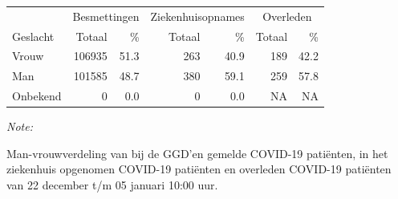 \documentclass[
  english,
  man,floatsintext]{apa6}
\begin{document}
\begin{table}
\centering\begingroup\fontsize{11}{13}\selectfont

\begin{threeparttable}
\begin{tabular}{lrrrrrr}
\toprule
\multicolumn{1}{c}{ } & \multicolumn{2}{c}{Besmettingen} & \multicolumn{2}{c}{Ziekenhuisopnames} & \multicolumn{2}{c}{Overleden} \\
\cmidrule(l{3pt}r{3pt}){2-3} \cmidrule(l{3pt}r{3pt}){4-5} \cmidrule(l{3pt}r{3pt}){6-7}
Geslacht & Totaal & \% & Totaal & \% & Totaal & \%\\
\midrule
Vrouw & 106935 & 51.3 & 263 & 40.9 & 189 & 42.2\\
Man & 101585 & 48.7 & 380 & 59.1 & 259 & 57.8\\
Onbekend & 0 & 0.0 & 0 & 0.0 & NA & NA\\
\bottomrule
\end{tabular}
\begin{tablenotes}
\item \textit{Note: } 
\item Man-vrouwverdeling van bij de GGD’en gemelde COVID-19 patiënten, in het ziekenhuis opgenomen COVID-19 patiënten en overleden COVID-19 patiënten van 22 december t/m 05 januari 10:00 uur.
\end{tablenotes}
\end{threeparttable}
\endgroup{}
\end{table}
\newpage
\end{document}
